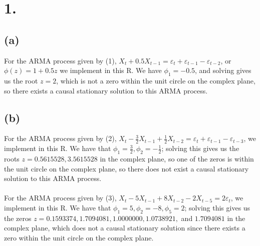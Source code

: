 \documentclass{article}
\begin{document}
\thispagestyle{firstpageheader}

\section*{1.}
{\Large 
\subsection*{(a)}

For the ARMA process given by (1), $X_t + 0.5X_{t-1} = \varepsilon_t + \varepsilon_{t-1} - \varepsilon_{t-2}$, or $\phi(z) = 1 + 0.5z$ we implement in this R. We have $\phi_1 = -0.5$, and solving gives us the root $z = 2$, which is not a zero within the unit circle on the complex plane, so there exists a causal stationary solution to this ARMA process.

\subsection*{(b)}

For the ARMA process given by (2), $X_t - \frac{3}{2}X_{t-1} + \frac{1}{2}X_{t-2}= \varepsilon_t + \varepsilon_{t-1} - \varepsilon_{t-3}$, we implement in this R. We have that $\phi_1 = \frac{3}{2}, \phi_2 = -\frac{1}{2}$; solving this gives us the roots $z = 0.5615528, 3.5615528$ in the complex plane, so one of the zeros is within the unit circle on the complex plane, so there does not exist a causal stationary solution to this ARMA process. \\ \\
For the ARMA process given by (3), $X_t - 5X_{t-1} + 8X_{t-2} - 2X_{t-5}= 2\varepsilon_t$, we implement in this R. We have that $\phi_1 = 5, \phi_2 = -8, \phi_5 = 2$; solving this gives us the zeros $z = 0.1593374, 1.7094081, 1.0000000, 1.0738921,$ and $1.7094081$ in the complex plane, which does not a causal stationary solution since there exists a zero within the unit circle on the complex plane.
\newpage

}
\end{document}
